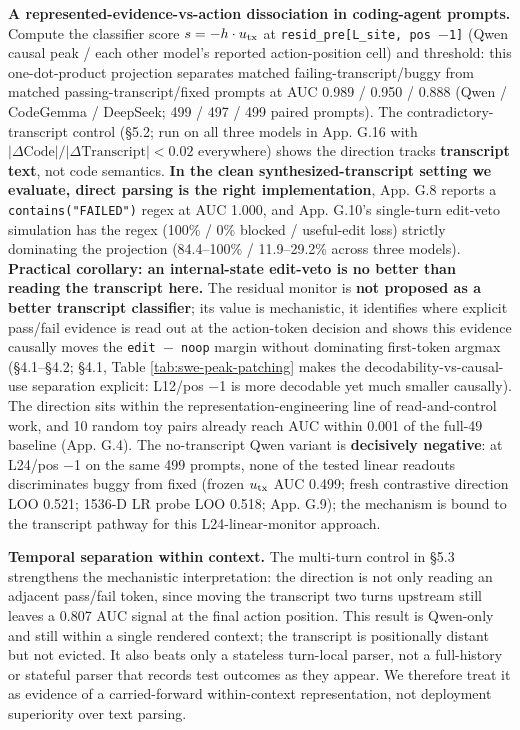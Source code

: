 \documentclass[
  11pt,
  a4paper]{article}
\newcounter{none} %
\begin{document}
\textbf{A represented-evidence-vs-action dissociation in coding-agent
prompts.} Compute the classifier score \(s=-h\cdot u_{\rm tx}\) at
\texttt{resid\_pre{[}L\_site,\ pos\ \ensuremath{-}1{]}} (Qwen causal peak / each
other model's reported action-position cell) and threshold: this
one-dot-product projection separates matched failing-transcript/buggy
from matched passing-transcript/fixed prompts at AUC 0.989 / 0.950 /
0.888 (Qwen / CodeGemma / DeepSeek; 499 / 497 / 499 paired prompts). The
contradictory-transcript control (\S{}5.2; run on all three models in App.
G.16 with \(|\Delta\mathrm{Code}|/|\Delta\mathrm{Transcript}| < 0.02\)
everywhere) shows the direction tracks \textbf{transcript text}, not
code semantics. \textbf{In the clean synthesized-transcript setting we
evaluate, direct parsing is the right implementation}, App. G.8 reports
a \texttt{contains("FAILED")} regex at AUC 1.000, and App. G.10's
single-turn edit-veto simulation has the regex (100\% / 0\% blocked /
useful-edit loss) strictly dominating the projection (84.4--100\% /
11.9--29.2\% across three models). \textbf{Practical corollary: an
internal-state edit-veto is no better than reading the transcript here.}
The residual monitor is \textbf{not proposed as a better transcript
classifier}; its value is mechanistic, it identifies where explicit
pass/fail evidence is read out at the action-token decision and shows
this evidence causally moves the \texttt{edit\ \ensuremath{-}\ noop} margin without
dominating first-token argmax (\S{}4.1--\S{}4.2; \S{}4.1, Table
\ref{tab:swe-peak-patching} makes the decodability-vs-causal-use
separation explicit: L12/pos \ensuremath{-}1 is more decodable yet much smaller
causally). The direction sits within the representation-engineering
\citep{zou2023representation, rimsky2024caa} line of read-and-control
work, and 10 random toy pairs already reach AUC within 0.001 of the
full-49 baseline (App. G.4). The no-transcript Qwen variant is
\textbf{decisively negative}: at L24/pos \ensuremath{-}1 on the same 499 prompts,
none of the tested linear readouts discriminates buggy from fixed
(frozen \(u_{\rm tx}\) AUC 0.499; fresh contrastive direction LOO 0.521;
1536-D LR probe LOO 0.518; App. G.9); the mechanism is bound to the
transcript pathway for this L24-linear-monitor approach.

\textbf{Temporal separation within context.} The multi-turn control in
\S{}5.3 strengthens the mechanistic interpretation: the direction is not
only reading an adjacent pass/fail token, since moving the transcript
two turns upstream still leaves a 0.807 AUC signal at the final action
position. This result is Qwen-only and still within a single rendered
context; the transcript is positionally distant but not evicted. It also
beats only a stateless turn-local parser, not a full-history or stateful
parser that records test outcomes as they appear. We therefore treat it
as evidence of a carried-forward within-context representation, not
deployment superiority over text parsing.
\end{document}
